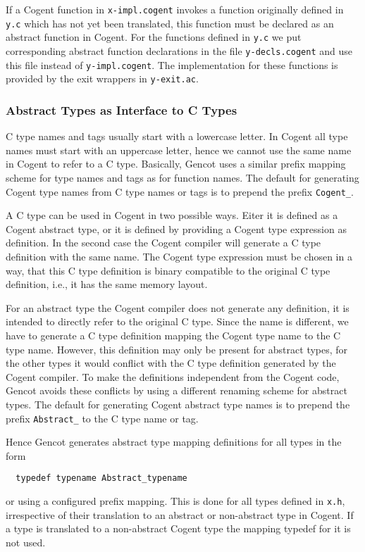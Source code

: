 \documentclass[a4paper]{report}
\newcommand{\code}[1]{\textnormal{\texttt{#1}}}
\begin{document}
If a Cogent function in \code{x-impl.cogent} invokes a function originally defined in \code{y.c} which has not yet
been translated, this function must be declared as an abstract function in Cogent. For the 
functions defined in \code{y.c} we put corresponding abstract function declarations in the file \code{y-decls.cogent} 
and use this file instead of \code{y-impl.cogent}. The implementation for these functions is provided by the
exit wrappers in \code{y-exit.ac}.

\subsubsection{Abstract Types as Interface to C Types}
\label{design-type-names}

C type names and tags usually start with a lowercase letter. In Cogent all type names must start with an uppercase letter, hence
we cannot use the same name in Cogent to refer to a C type. Basically, Gencot uses a similar prefix mapping scheme for type names and tags 
as for function names. The default for generating Cogent type names from C type names or tags is to
prepend the prefix \code{Cogent\_}.

A C type can be used in Cogent in two possible ways. Eiter it is defined as a Cogent abstract type, or it is defined by providing
a Cogent type expression as definition. In the second case the Cogent compiler will generate a C type definition with the
same name. The Cogent type expression must be chosen in a way, that this C type definition is binary compatible to the
original C type definition, i.e., it has the same memory layout. 

For an abstract type the Cogent compiler does not generate any definition, it is intended to directly refer to the original
C type. Since the name is different, we have to generate a C type definition mapping the Cogent type name to the C type name.
However, this definition may only be present for abstract types, for the other types it would conflict with the C type
definition generated by the Cogent compiler. To make the definitions independent from the Cogent code, Gencot avoids these conflicts
by using a different renaming scheme for abstract types. The default for generating Cogent abstract type names is
to prepend the prefix \code{Abstract\_} to the C type name or tag. 

Hence Gencot generates abstract type mapping definitions for all types in the form
\begin{verbatim}
  typedef typename Abstract_typename
\end{verbatim}
or using a configured prefix mapping. This is done for all types defined in \code{x.h}, irrespective of their translation
to an abstract or non-abstract type in Cogent. If a type is translated to a non-abstract Cogent type the mapping typedef
for it is not used.
\end{document}
